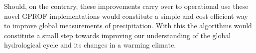 \documentclass[a4paper,11pt,bibtotoc]{scrartcl}
\begin{document}
Should, on the contrary, these improvements carry over to operational use these
novel GPROF implementations would constitute a simple and cost efficient way to
improve global measurements of precipitation. With this the algorithms would
constitute a small step towards improving our understanding of the global
hydrological cycle and its changes in a warming climate.


%
%
%
%
\end{document}

